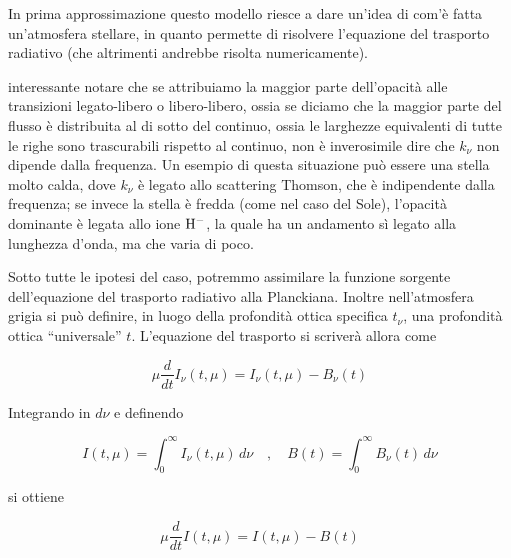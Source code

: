 In prima approssimazione questo modello riesce a dare un'idea di com'è fatta un'atmosfera stellare, in quanto permette di risolvere l'equazione del trasporto radiativo (che altrimenti andrebbe risolta numericamente).

\E interessante notare che se attribuiamo la maggior parte dell'opacità alle transizioni legato-libero o libero-libero, ossia se diciamo che la maggior parte del flusso è distribuita al di sotto del continuo, ossia le larghezze equivalenti di tutte le righe sono trascurabili rispetto al continuo, non è inverosimile dire che $k_{\nu}$ non dipende dalla frequenza. Un esempio di questa situazione può essere una stella molto calda, dove $k_{\nu}$ è legato allo scattering Thomson, che è indipendente dalla frequenza; se invece la stella è fredda (come nel caso del Sole), l'opacità dominante è legata allo ione $\rm H^-$, la quale ha un andamento sì legato alla lunghezza d'onda, ma che varia di poco.


Sotto tutte le ipotesi del caso, potremmo assimilare la funzione sorgente dell'equazione del trasporto radiativo alla Planckiana. Inoltre nell'atmosfera grigia si può definire, in luogo della profondità ottica specifica
$t_{\nu}$, una profondità ottica “universale” $t$. L'equazione del trasporto si scriverà allora come

\begin{equation}
    \mu \frac{d}{dt} I_{\nu}(t,\mu)=I_{\nu}(t,\mu) - B_{\nu}(t)
\end{equation}

Integrando in $d\nu$ e definendo

\begin{equation*}
    I(t,\mu)=\int_{0}^{\infty} I_{\nu}(t,\mu) \, d\nu
    \quad,\quad
    B(t)=\int_{0}^{\infty} B_{\nu}(t) \, d\nu
\end{equation*}

si ottiene 

\begin{equation}
    \mu \frac{d}{dt} I(t,\mu)=I(t,\mu) - B(t)
    \label{eq:trasp_rad_integrata_rispetto_a_mu}
\end{equation}

